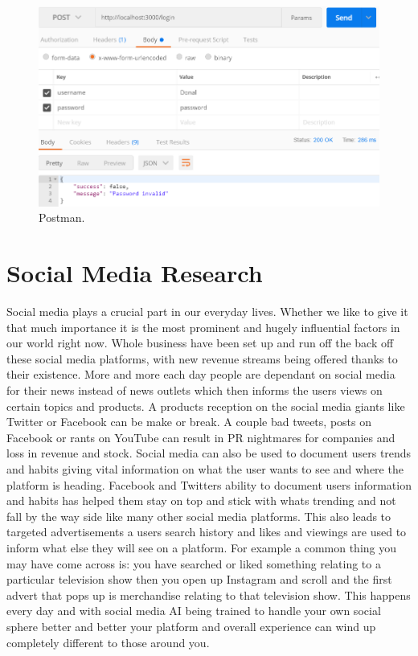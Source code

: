 \begin{figure}[H]
\centering
\includegraphics[]{img/postman.png}
\caption{Postman.}
\end{figure}


\section{Social Media Research}

Social media plays a crucial part in our everyday lives. Whether we like to give it that much importance it is the most prominent and hugely influential factors in our world right now. Whole business have been set up and run off the back off these social media platforms, with new revenue streams being offered thanks to their existence. More and more each day people are dependant on social media for their news instead of news outlets which then informs the users views on certain topics and products. A products reception on the social media giants like Twitter or Facebook can be make or break. A couple bad tweets, posts on Facebook or rants on YouTube can result in PR nightmares for companies and loss in revenue and stock. Social media can also be used to document users trends and habits giving vital information on what the user wants to see and where the platform is heading. 
Facebook and Twitters ability to document users information and habits has helped them stay on top and stick with whats trending and not fall by the way side like many other social media platforms. This also leads to targeted advertisements a users search history and likes and viewings are used to inform what else they will see on a platform. For example a common thing you may have come across is: you have searched or liked something relating to a particular television show then you open up Instagram and scroll and the first advert that pops up is merchandise relating to that television show. This happens every day and with social media AI being trained to handle your own social sphere better and better your platform and overall experience can wind up completely different to those around you. 

